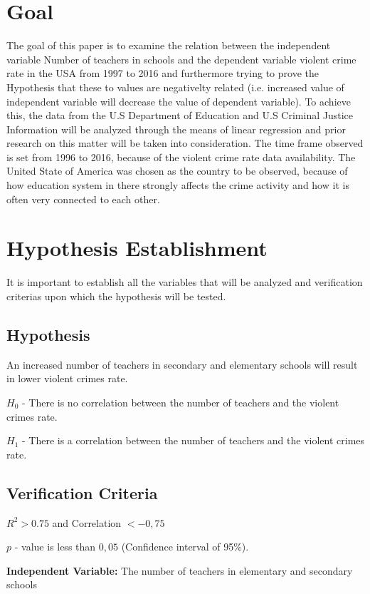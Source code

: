 \documentclass[thesis=B,english]{FITthesis}[2012/10/20]
\begin{document}
\section{Goal}
The goal of this paper is to examine the relation between the independent variable
Number of teachers in schools  and the dependent variable violent crime rate in the USA from 1997 to
2016 and furthermore trying to prove the Hypothesis that these to values are negativelty related (i.e. increased value of independent variable will decrease the value of dependent variable). To achieve this, the data from the
U.S Department of Education \cite{tableteacher} and U.S Criminal Justice Information \cite{tablecrime} will be analyzed through the means of linear regression and prior research on this matter will be taken into consideration. The time frame observed is set from 1996 to 2016, because of the violent crime rate data availability. The United State of America was chosen as the country to be observed, because of how education system in there strongly affects the crime activity and how it is often very connected to each other.  

\section{Hypothesis Establishment}
It is important to establish all the variables that will be analyzed and verification criterias upon which the hypothesis will be tested.
\subsection{Hypothesis}
An increased number of teachers in secondary and elementary schools will result in lower violent crimes rate.

$H_0$ - There is no correlation between the number of teachers and the violent crimes rate.

$H_1$ - There is a correlation between the number of teachers and the violent crimes rate.

\subsection{Verification Criteria}
$R^2 > 0.75$ and Correlation  $< -0,75$

\noindent $p$ - value is less than $0,05$ (Confidence interval of 95\%).

 
\textbf{Independent Variable:} The number of teachers in elementary and secondary schools
\end{document}
